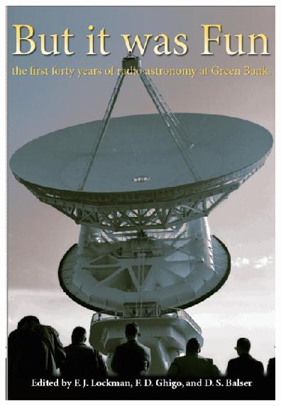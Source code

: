 \documentclass[aspectratio=169]{beamer} %
\begin{document}
\begin{frame}{}
\begin{columns}
\begin{column}{0.6\textwidth}
		\end{column}
		\begin{column}{0.35\textwidth}
			\begin{center}
				\includegraphics[width=1.0\linewidth, height=0.85\textheight]{../images/but_it_was_fun_cover.jpeg}
			\end{center}
		\end{column}
	\end{columns}
\end{frame}
\end{document}
